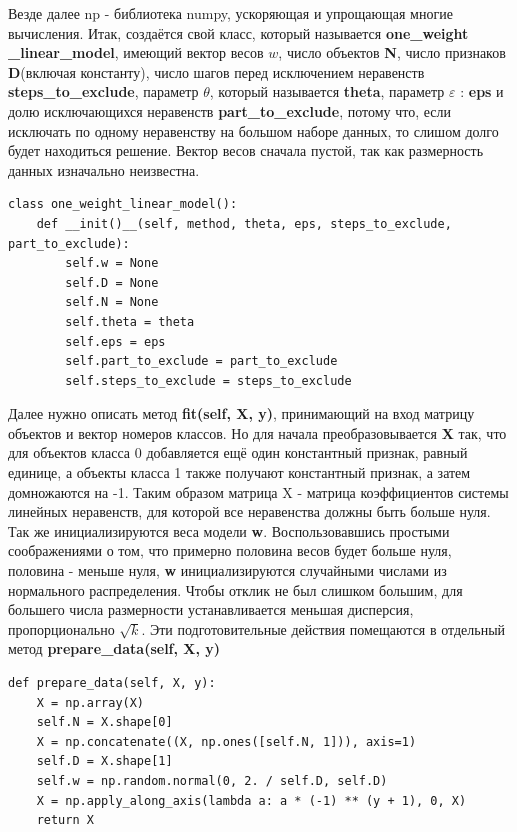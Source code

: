 \documentclass[a4paper]{article}
\begin{document}
Везде далее np - библиотека numpy, ускоряющая и упрощающая многие вычисления. Итак, создаётся свой класс, который называется \textbf{one\_weight \_linear\_model}, имеющий вектор весов $w$, число объектов \textbf{N}, число признаков \textbf{D}(включая константу), число шагов перед исключением неравенств \textbf{steps\_to\_exclude}, параметр $\theta$, который называется \textbf{theta}, параметр $\varepsilon$ : \textbf{eps} и долю исключающихся неравенств \textbf{part\_to\_exclude}, потому что, если исключать по одному неравенству на большом наборе данных, то слишом долго будет находиться решение. Вектор весов сначала пустой, так как размерность данных изначально неизвестна.
\begin{lstlisting}
class one_weight_linear_model():
	def __init()__(self, method, theta, eps, steps_to_exclude, part_to_exclude):
		self.w = None
		self.D = None
		self.N = None
		self.theta = theta
		self.eps = eps
		self.part_to_exclude = part_to_exclude
		self.steps_to_exclude = steps_to_exclude
\end{lstlisting}

Далее нужно описать метод \textbf{fit(self, X, y)}, принимающий на вход матрицу объектов и вектор номеров классов. Но для начала преобразовывается \textbf{X} так, что для объектов класса 0 добавляется ещё один константный признак, равный единице, а объекты класса 1 также получают константный признак, а затем домножаются на -1. Таким образом матрица X - матрица коэффициентов системы линейных неравенств, для которой все неравенства должны быть больше нуля. Так же инициализируются веса модели \textbf{w}. Воспользовавшись простыми соображениями о том, что примерно половина весов будет больше нуля, половина - меньше нуля, \textbf{w} инициализируются случайными числами из нормального распределения. Чтобы отклик не был слишком большим, для большего числа размерности устанавливается меньшая дисперсия, пропорционально $\sqrt{k}$. Эти подготовительные действия помещаются в отдельный метод \textbf{prepare\_data(self, X, y)}
\begin{lstlisting}
def prepare_data(self, X, y):
	X = np.array(X)
	self.N = X.shape[0]
	X = np.concatenate((X, np.ones([self.N, 1])), axis=1)
	self.D = X.shape[1]
	self.w = np.random.normal(0, 2. / self.D, self.D)
	X = np.apply_along_axis(lambda a: a * (-1) ** (y + 1), 0, X)
	return X
\end{lstlisting}
\end{document}
